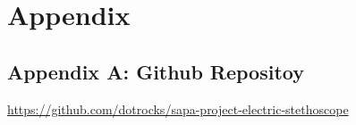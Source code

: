 \documentclass[
	12pt,twoside,a4paper
]{report}
\begin{document}
	
	\tableofcontents

	
	
	
	

	\newpage
	\thispagestyle{plain}

	\chapter*{Appendix}

	\section*{Appendix A: Github Repositoy}\label{sec:appendix_a}
	\url{https://github.com/dotrocks/sapa-project-electric-stethoscope}

	\printbibliography{}
\end{document}
